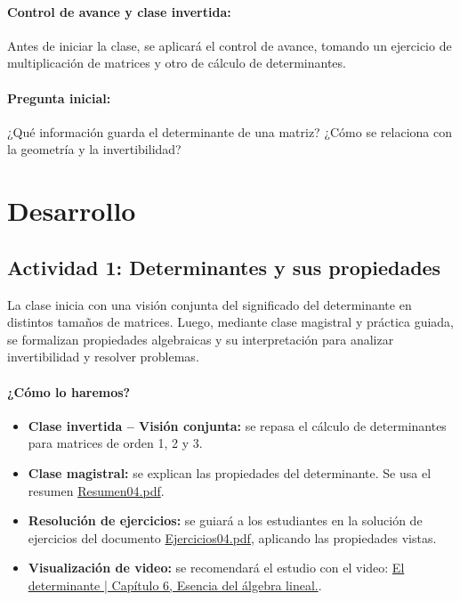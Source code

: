 \documentclass[a4,11pt]{aleph-notas}
\begin{document}
\paragraph{Control de avance y clase invertida:}
Antes de iniciar la clase, se aplicará el control de avance, tomando un ejercicio de multiplicación de matrices y otro de cálculo de determinantes.

\paragraph{Pregunta inicial:}
¿Qué información guarda el determinante de una matriz? ¿Cómo se relaciona con la geometría y la invertibilidad?

\section*{Desarrollo}

\subsection*{Actividad 1: Determinantes y sus propiedades}

La clase inicia con una visión conjunta del significado del determinante en distintos tamaños de matrices. Luego, mediante clase magistral y práctica guiada, se formalizan propiedades algebraicas y su interpretación para analizar invertibilidad y resolver problemas.

\paragraph{¿Cómo lo haremos?}
\begin{itemize}[leftmargin=*]
    \item \textbf{Clase invertida -- Visión conjunta:} se repasa el cálculo de determinantes para matrices de orden 1, 2 y 3.
    \item \textbf{Clase magistral:} se explican las propiedades del determinante. Se usa el resumen \href{https://fcena-puce.github.io/AlgebraLineal-05-N0048/01Resumen/Resumen04.pdf}{Resumen04.pdf}.
    \item \textbf{Resolución de ejercicios:} se guiará a los estudiantes en la solución de ejercicios del documento \href{https://fcena-puce.github.io/AlgebraLineal-05-N0048/04Ejercicios/Ejercicios04.pdf}{Ejercicios04.pdf}, aplicando las propiedades vistas.
    \item \textbf{Visualización de video:} se recomendará el estudio con el video: \href{https://youtu.be/Ip3X9LOh2dk?si=Z8KpgrPdLpy8l48A}{El determinante | Capítulo 6, Esencia del álgebra lineal.}.
\end{itemize}
\end{document}
